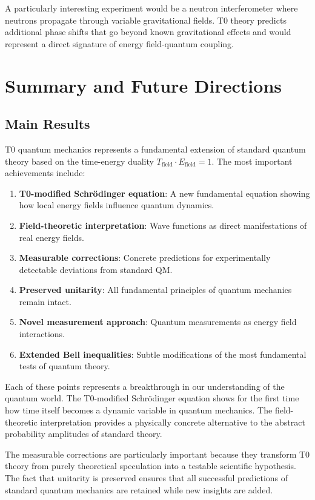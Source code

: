 \documentclass[12pt,a4paper]{article}
\theoremstyle{definition}
\theoremstyle{remark}
\begin{document}
A particularly interesting experiment would be a neutron interferometer where neutrons propagate through variable gravitational fields. T0 theory predicts additional phase shifts that go beyond known gravitational effects and would represent a direct signature of energy field-quantum coupling.

\section{Summary and Future Directions}

\subsection{Main Results}

T0 quantum mechanics represents a fundamental extension of standard quantum theory based on the time-energy duality $T_{\text{field}} \cdot E_{\text{field}} = 1$. The most important achievements include:

\begin{enumerate}
	\item \textbf{T0-modified Schrödinger equation}: A new fundamental equation showing how local energy fields influence quantum dynamics.
	\item \textbf{Field-theoretic interpretation}: Wave functions as direct manifestations of real energy fields.
	\item \textbf{Measurable corrections}: Concrete predictions for experimentally detectable deviations from standard QM.
	\item \textbf{Preserved unitarity}: All fundamental principles of quantum mechanics remain intact.
	\item \textbf{Novel measurement approach}: Quantum measurements as energy field interactions.
	\item \textbf{Extended Bell inequalities}: Subtle modifications of the most fundamental tests of quantum theory.
\end{enumerate}

Each of these points represents a breakthrough in our understanding of the quantum world. The T0-modified Schrödinger equation shows for the first time how time itself becomes a dynamic variable in quantum mechanics. The field-theoretic interpretation provides a physically concrete alternative to the abstract probability amplitudes of standard theory.

The measurable corrections are particularly important because they transform T0 theory from purely theoretical speculation into a testable scientific hypothesis. The fact that unitarity is preserved ensures that all successful predictions of standard quantum mechanics are retained while new insights are added.
\end{document}
